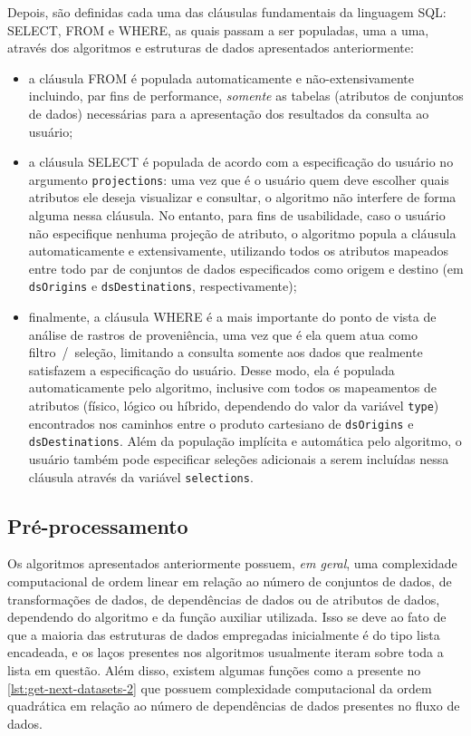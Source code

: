 Depois, são definidas cada uma das cláusulas fundamentais da linguagem SQL: \textsc{SELECT}, \textsc{FROM} e \textsc{WHERE}, as quais passam a ser populadas, uma a uma, através dos algoritmos e estruturas de dados apresentados anteriormente:

\begin{itemize}
    \item a cláusula \textsc{FROM} é populada automaticamente e não-extensivamente incluindo, par fins de performance, \emph{somente} as tabelas (atributos de conjuntos de dados) necessárias para a apresentação dos resultados da consulta ao usuário;
    \item a cláusula \textsc{SELECT} é populada de acordo com a especificação do usuário no argumento \texttt{projections}: uma vez que é o usuário quem deve escolher quais atributos ele deseja visualizar e consultar, o algoritmo não interfere de forma alguma nessa cláusula. No entanto, para fins de usabilidade, caso o usuário não especifique nenhuma projeção de atributo, o algoritmo popula a cláusula automaticamente e extensivamente, utilizando todos os atributos mapeados entre todo par de conjuntos de dados especificados como origem e destino (em \texttt{dsOrigins} e \texttt{dsDestinations}, respectivamente);
    \item finalmente, a cláusula \textsc{WHERE} é a mais importante do ponto de vista de análise de rastros de proveniência, uma vez que é ela quem atua como filtro~/~seleção, limitando a consulta somente aos dados que realmente satisfazem a especificação do usuário. Desse modo, ela é populada automaticamente pelo algoritmo, inclusive com todos os mapeamentos de atributos (físico, lógico ou híbrido, dependendo do valor da variável \texttt{type}) encontrados nos caminhos entre o produto cartesiano de \texttt{dsOrigins} e \texttt{dsDestinations}. Além da população implícita e automática pelo algoritmo, o usuário também pode especificar seleções adicionais a serem incluídas nessa cláusula através da variável \texttt{selections}.
\end{itemize}

\subsection{Pré-processamento}%
\label{subsec:preprocessamento}

Os algoritmos apresentados anteriormente possuem, \emph{em geral}, uma complexidade computacional de ordem linear em relação ao número de conjuntos de dados, de transformações de dados, de dependências de dados ou de atributos de dados, dependendo do algoritmo e da função auxiliar utilizada. Isso se deve ao fato de que a maioria das estruturas de dados empregadas inicialmente é do tipo lista encadeada, e os laços presentes nos algoritmos usualmente iteram sobre toda a lista em questão. Além disso, existem algumas funções como a presente no \autoref{lst:get-next-datasets-2} que possuem complexidade computacional da ordem quadrática em relação ao número de dependências de dados presentes no fluxo de dados.


